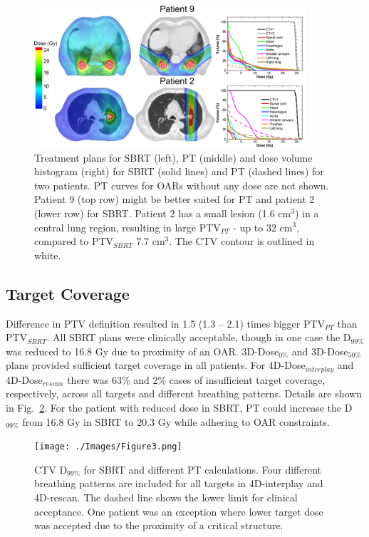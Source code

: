 \documentclass[type=dr, dr=rernat, acm$^3$entcolor=tud7b,colorbacktitle, bigchapter, openright, twoside, 12pt ]{tudthesis}
\begin{document}
\begin{figure}[H]
\begin{center}
\includegraphics[width=0.9\textwidth]{./Images/Figure2.png}
\caption{Treatment plans for SBRT (left), PT (middle) and dose volume histogram (right) for SBRT (solid lines) and PT (dashed lines) for two patients. PT curves for OARs without any dose are not shown. Patient 9 (top row) might be better suited for PT and patient 2 (lower row) for SBRT. Patient 2 has a small lesion (1.6 cm$^{3}$) in a central lung region, resulting in large PTV$_{PT}$ - up to 32 cm$^{3}$, compared to PTV$_{SBRT}$ 7.7 cm$^{3}$. The CTV contour is outlined in white.}
\label{Fig:TreatmentPlans}
\end{center}
\end{figure}

\subsection{Target Coverage}

Difference in PTV definition resulted in 1.5 (1.3 – 2.1) times bigger PTV$_{PT}$ than PTV$_{SBRT}$. All SBRT plans were clinically acceptable, though in one case the D$_{99\%}$ was reduced to 16.8 Gy due to proximity of an OAR. 3D-Dose$_{0\%}$ and 3D-Dose$_{50\%}$plans provided sufficient target coverage in all patients. For 4D-Dose$_{interplay}$ and 4D-Dose$_{rescan}$ there was 63\% and 2\% cases of insufficient target coverage, respectively, across all targets and different breathing patterns. Details are shown in Fig.~\ref{Fig:InterplayDiff}. For the patient with reduced dose in SBRT, PT could increase the D$_{99\%}$ from 16.8 Gy in SBRT to 20.3 Gy while adhering to OAR constraints. 


\begin{figure}[H]
\begin{center}
\texttt{[image: ./Images/Figure3.png]}
\caption{CTV D$_{99\%}$ for SBRT and different PT calculations. Four different breathing patterns are included for all targets in 4D-interplay and 4D-rescan. The dashed line shows the lower limit for clinical acceptance. One patient was an exception where lower target dose was accepted due to the proximity of a critical structure.  }
\label{Fig:InterplayDiff}
\end{center}
\end{figure}
\newpage
\end{document}
